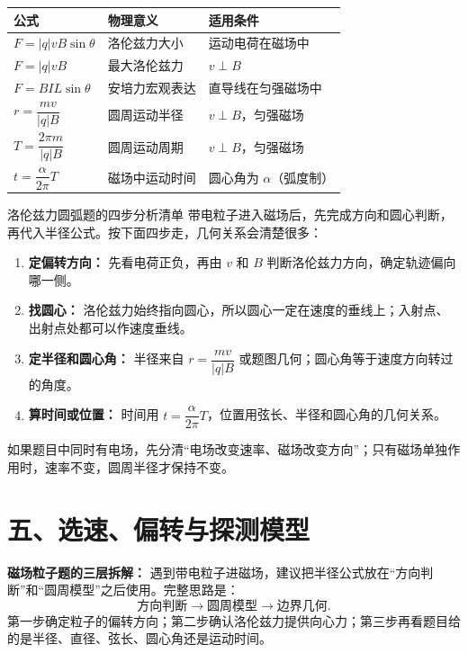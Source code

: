 \begin{center}
\begingroup
\renewcommand{\arraystretch}{1.35}
\begin{tabular}{lll}
\toprule
公式 & 物理意义 & 适用条件 \\
\midrule
$F=|q|vB\sin\theta$ & 洛伦兹力大小 & 运动电荷在磁场中 \\
$F=|q|vB$ & 最大洛伦兹力 & $v\perp B$ \\
$F=BIL\sin\theta$ & 安培力宏观表达 & 直导线在匀强磁场中 \\
$r=\dfrac{mv}{|q|B}$ & 圆周运动半径 & $v\perp B$，匀强磁场 \\
$T=\dfrac{2\pi m}{|q|B}$ & 圆周运动周期 & $v\perp B$，匀强磁场 \\
$t=\dfrac{\alpha}{2\pi}T$ & 磁场中运动时间 & 圆心角为 $\alpha$（弧度制） \\
\bottomrule
\end{tabular}
\endgroup
\end{center}

\begin{learningbox}{洛伦兹力圆弧题的四步分析清单}
带电粒子进入磁场后，先完成方向和圆心判断，再代入半径公式。按下面四步走，几何关系会清楚很多：
\begin{enumerate}
  \item \textbf{定偏转方向：} 先看电荷正负，再由 $v$ 和 $B$ 判断洛伦兹力方向，确定轨迹偏向哪一侧。
  \item \textbf{找圆心：} 洛伦兹力始终指向圆心，所以圆心一定在速度的垂线上；入射点、出射点处都可以作速度垂线。
  \item \textbf{定半径和圆心角：} 半径来自 $r=\dfrac{mv}{|q|B}$ 或题图几何；圆心角等于速度方向转过的角度。
  \item \textbf{算时间或位置：} 时间用 $t=\dfrac{\alpha}{2\pi}T$，位置用弦长、半径和圆心角的几何关系。
\end{enumerate}
如果题目中同时有电场，先分清“电场改变速率、磁场改变方向”；只有磁场单独作用时，速率不变，圆周半径才保持不变。
\end{learningbox}

\section*{五、选速、偏转与探测模型}

\textbf{磁场粒子题的三层拆解：} 遇到带电粒子进磁场，建议把半径公式放在“方向判断”和“圆周模型”之后使用。完整思路是：
\[
\text{方向判断}\rightarrow\text{圆周模型}\rightarrow\text{边界几何}.
\]
第一步确定粒子的偏转方向；第二步确认洛伦兹力提供向心力；第三步再看题目给的是半径、直径、弦长、圆心角还是运动时间。

